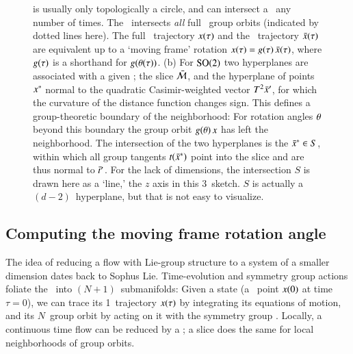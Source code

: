\documentclass[preprint,12pt]{elsarticle} %
\begin{document}
\begin{figure}
{is usually only topologically a circle, and can intersect a \slice\
any number of times. The \slice\ intersects {\em all} full
\statesp\ group orbits (indicated by dotted lines here).  The full
\statesp\ trajectory $x(\tau)$ and the \reducedsp\ trajectory
$\bar{x}(\tau)$ are equivalent up to a `moving frame' rotation
$x(\tau)=g(\tau)\,\bar{x}(\tau)$, where $g(\tau)$ is
a shorthand for $g({\bf \theta}(\tau))$.
(b)
For $\textrm{SO}(2)$ two hyperplanes are associated with  a given {\template}
\slicep; the slice $\bar{\cal M}$, and the hyperplane of points $x^*$
normal to the quadratic Casimir-weighted vector $T^2\bar{x}'$, for which
the curvature \refeq{SO2inflPoint} of the distance function
 changes sign. This defines a group-theoretic
boundary of the {\template} neighborhood: For rotation angles ${\bf \theta}$
beyond this boundary the group orbit $g({\bf \theta})\,x$ has left the
neighborhood. The intersection of the two hyperplanes is the {\em \sset}
$\bar{x}^* \in S$, within which all group tangents $t(\bar{x}^*)$
point into the slice and are thus normal to $\bar{t}{}'_{}$. For the
lack of dimensions, the intersection $S$ is drawn here as a `line,'
the $z$ axis in this 3\dmn\ sketch. $S$ is actually
a $(d\!-\!2)$\dmn\ hyperplane, but that is not easy to visualize.
 }%
 \end{figure}


\subsection{Computing the moving frame rotation angle}
\label{exam:CLErotAngle}

															\toCB
The idea of reducing a flow with Lie-group structure to a system of a
smaller dimension dates back to Sophus Lie.
Time-evolution and symmetry group actions foliate the \statesp\ into
$(N\!+\!1)$\dmn\ submanifolds: Given a state (a \statesp\ point $x(0)$
at time $\tau=0$), we can trace its  1\dmn\ trajectory $x(\tau)$ by
integrating its equations of motion, and its $N$\dmn\ group orbit by
acting on it with the symmetry group \Group. Locally, a continuous time
flow can be reduced by a \PoincSec; a slice does the same for local
neighborhoods of group orbits.
\end{document}
